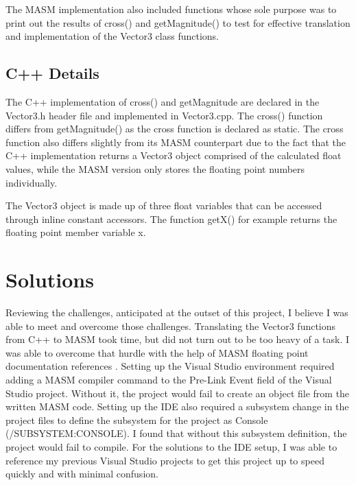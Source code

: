 \documentclass[12pt]{article}
\begin{document}
The MASM implementation also included functions whose sole purpose was to print out the results of cross() and getMagnitude() to test for effective translation and implementation of the Vector3 class functions.

\subsection{C++ Details}
The C++ implementation of cross() and getMagnitude are declared in the Vector3.h header file and implemented in Vector3.cpp. The cross() function differs from getMagnitude() as the cross function is declared as static. The cross function also differs slightly from its MASM counterpart due to the fact that the C++ implementation returns a Vector3 object comprised of the calculated float values, while the MASM version only stores the floating point numbers individually.

The Vector3 object is made up of three float variables that can be accessed through inline constant accessors. The function getX() for example returns the floating point member variable x.

\clearpage
\section{Solutions}
Reviewing the challenges, anticipated at the outset of this project, I believe I was able to meet and overcome those challenges. Translating the Vector3 functions from C++ to MASM took time, but did not turn out to be too heavy of a task. I was able to overcome that hurdle with the help of MASM floating point documentation references \cite{masm_fpu_docs}. 
\newline
\newline
Setting up the Visual Studio environment required adding a MASM compiler command to the Pre-Link Event field of the Visual Studio project. Without it, the project would fail to create an object file from the written MASM code. Setting up the IDE also required a subsystem change in the project files to define the subsystem for the project as Console (/SUBSYSTEM:CONSOLE). I found that without this subsystem definition, the project would fail to compile. For the solutions to the IDE setup, I was able to reference my previous Visual Studio projects to get this project up to speed quickly and with minimal confusion. 
\newline
\end{document}
